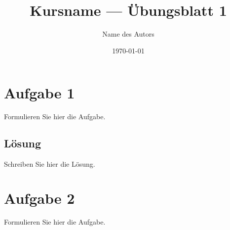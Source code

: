 \documentclass[11pt]{article}
\title{Kursname — Übungsblatt 1}
\author{Name des Autors}
\date{\today}
\begin{document}
\maketitle

\section*{Aufgabe 1}
Formulieren Sie hier die Aufgabe.

\subsection*{Lösung}
Schreiben Sie hier die Lösung.

\section*{Aufgabe 2}
Formulieren Sie hier die Aufgabe.
\end{document}
